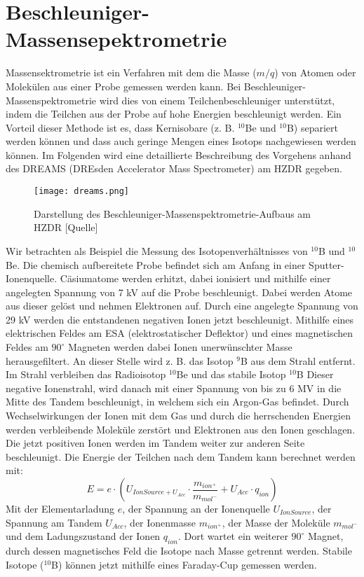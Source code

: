 \section{Beschleuniger-Massensepektrometrie}

Massensektrometrie ist ein Verfahren mit dem die Masse ($m/q$) von Atomen oder Molekülen aus einer Probe gemessen werden kann.
Bei Beschleuniger-Massenspektrometrie wird dies von einem Teilchenbeschleuniger unterstützt, indem die Teilchen aus der Probe auf hohe Energien beschleunigt werden.
Ein Vorteil dieser Methode ist es, dass Kernisobare (z. B. $^{10}$Be und $^{10}$B) separiert werden können und dass auch geringe Mengen eines Isotops nachgewiesen werden können.
Im Folgenden wird eine detaillierte Beschreibung des Vorgehens anhand des DREAMS (DREsden Accelerator Mass Spectrometer) am HZDR gegeben.

\begin{figure}[ht]
  \texttt{[image: dreams.png]}
  \caption{Darstellung des Beschleuniger-Massenspektrometrie-Aufbaus am HZDR [Quelle]}
  \label{dreams}
\end{figure}
Wir betrachten als Beispiel die Messung des Isotopenverhältnisses von  $^{10}$B und  $^{10}$Be.
Die chemisch aufbereitete Probe befindet sich am Anfang in einer Sputter-Ionenquelle.
Cäsiumatome werden erhitzt, dabei ionisiert und mithilfe einer angelegten Spannung von 7 kV auf die Probe beschleunigt.
Dabei werden Atome aus dieser gelöst und nehmen Elektronen auf.
Durch eine angelegte Spannung von 29 kV werden die entstandenen negativen Ionen jetzt beschleunigt.
Mithilfe eines elektrischen Feldes am ESA (elektrostatischer Deflektor) und eines magnetischen Feldes am $90^{\circ}$ Magneten werden dabei Ionen unerwünschter Masse herausgefiltert.
An dieser Stelle wird z. B. das Isotop  $^{9}$B aus dem Strahl entfernt.
Im Strahl verbleiben das Radioisotop $^{10}$Be und das stabile Isotop $^{10}$B
Dieser negative Ionenstrahl, wird danach mit einer Spannung von bis zu $6$ MV in die Mitte des Tandem beschleunigt, in welchem sich ein Argon-Gas befindet.
Durch Wechselwirkungen der Ionen mit dem Gas und durch die herrschenden Energien werden verbleibende Moleküle zerstört und Elektronen aus den Ionen geschlagen.
Die jetzt positiven Ionen werden im Tandem weiter zur anderen Seite beschleunigt.
Die Energie der Teilchen nach dem Tandem kann berechnet werden mit:
\begin{equation}
E = e \cdot (U_{IonSource + U_{Acc}} \cdot \frac{m_{ion^+}}{m_{mol^-}} + U_{Acc}\cdot q_{ion})
\end{equation}
Mit der Elementarladung $e$, der Spannung an der Ionenquelle $U_{IonSource}$, der Spannung am Tandem $U_{Acc}$, der Ionenmasse $m_{ion^+}$, der Masse der Moleküle $m_{mol^-}$ und dem Ladungszustand der Ionen $q_{ion}$.
Dort wartet ein weiterer $90^{\circ}$ Magnet, durch dessen magnetisches Feld die Isotope nach Masse getrennt werden.
Stabile Isotope ($^{10}$B) können jetzt mithilfe eines Faraday-Cup gemessen werden.

